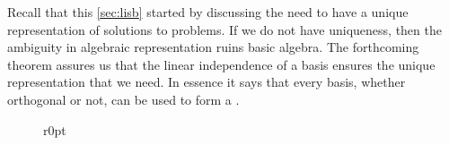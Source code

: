 Recall that this \cref{sec:lisb} started by discussing the need to have a unique representation of solutions to problems.
If we do not have uniqueness, then the ambiguity in algebraic representation ruins basic algebra.
The forthcoming theorem assures us that the linear independence of a basis ensures the unique representation that we need.
In essence it says that every basis, whether orthogonal or not, can be used to form a .



\begin{figure}[6]r{0pt}
\end{figure}
